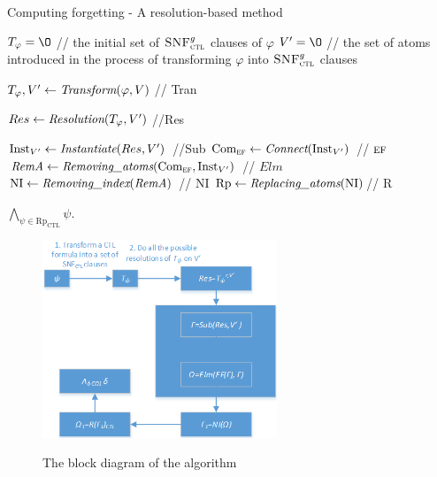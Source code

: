 \documentclass[runningheads]{llncs}
\newcommand{\lto}{\leftarrow}
\newcommand{\Elm}{\textit{Elm}}
\newcommand{\CTL}{\textrm{CTL}}
\newcommand{\Sub}{\textrm{Sub}}
\newcommand{\NI}{\textrm{NI}}
\newcommand{\Inst}{\textrm{Inst}}
\newcommand{\Com}{\textrm{Com}}
\newcommand{\Rp}{\textrm{Rp}}
\newcommand{\EXIST}{\textsc{e}}
\newcommand{\FUTURE}{\textsc{f}}
\newcommand{\CTLsnf}{{\textsc{SNF}_{\textsc{ctl}}^g}}
\begin{document}
\begin{algorithm}[!h]
\caption{Computing forgetting - A resolution-based method}%
\label{alg:compute:forgetting:by:Resolution}
$T_{\varphi}={\O}$ // the initial set of $\CTLsnf$ clauses of $\varphi$ \;
$V'={\O}$ // the set of atoms introduced in the process of transforming $\varphi$ into $\CTLsnf$ clauses\;


$T_{\varphi}, V' \lto \emph{Transform}(\varphi, V)$ // Tran\;

$Res \lto \emph{Resolution}(T_{\varphi}, V')$ //Res \;

$\Inst_{V'} \lto \emph{Instantiate}(Res, V')$ //\Sub\;
$\Com_{\EXIST\FUTURE} \lto \emph{Connect}(\Inst_{V'})$  // $\EXIST\FUTURE$\;
$\emph{RemA} \lto \emph{Removing\_atoms}(\Com_{\EXIST\FUTURE}, \Inst_{V'})$ // $\Elm$\;
$\NI \lto \emph{Removing\_index}(\emph{RemA})$ // $\NI$\;
$\Rp \lto \emph{Replacing\_atoms}(\NI)$// R\;

\Return $\bigwedge_{\psi \in \Rp_{\CTL}} \psi$.
\end{algorithm}

\begin{figure}
  \centering
  \includegraphics[width=7cm]{lct.png}\\
  \caption{The block diagram of the algorithm}\label{Fig:lct}
\end{figure}
\end{document}
